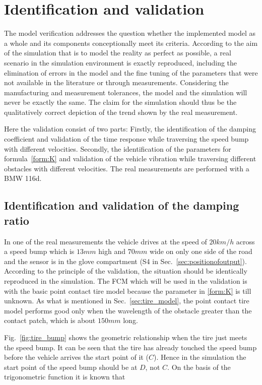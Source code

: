 \chapter{Identification and validation}
 \label{sec:identification and validation}

 The model verification addresses the question whether the implemented model as a whole and its components conceptionally meet its criteria. 
 According to the aim of the simulation that is to model the reality as perfect as possible, a real scenario in the simulation environment is exactly reproduced, including the elimination of errors in the model and the fine tuning of the parameters that were not available in the literature or through measurements. 
 Considering the manufacturing and measurement tolerances, the model and the simulation will never be exactly the same. The claim for the simulation should thus be the qualitatively correct depiction of the trend shown by the real measurement. 
 
 Here the validation consist of two parts: Firstly, the identification of the damping coefficient and validation of the time response while traversing the speed bump with different velocities. Secondly, the identification of the parameters for formula~\ref{form:K} and validation of the vehicle vibration while traversing different obstacles with different velocities.
 The real measurements are performed with a BMW 116d.
 
 
 \section{Identification and validation of the damping ratio}
 
 In one of the real measurements the vehicle drives at the speed of $20km/h$ across a speed bump which is $13mm$ high and $70mm$ wide on only one side of the road and the sensor is in the glove compartment (S4 in Sec.~\ref{sec:positionofoutput}). 
 According to the principle of the validation, the situation should be identically reproduced in the simulation. 
 The \ac{FCM} which will be used in the validation is with the basic point contact tire model because the parameter in \ref{form:K} is till unknown.
 As what is mentioned in Sec.~\ref{sec:tire_model}, the point contact tire model performs good only when the wavelength of the obstacle greater than the contact patch, which is about $150mm$ long.
 
 Fig.~\ref{fig:tire_bump} shows the geometric relationship when the tire just meets the speed bump.
 It can be seen that the tire has already touched the speed bump before the vehicle arrives the start point of it ($C$).
 Hence in the simulation the start point of the speed bump should be at $D$, not $C$.
 On the basis of the trigonometric function it is known that

